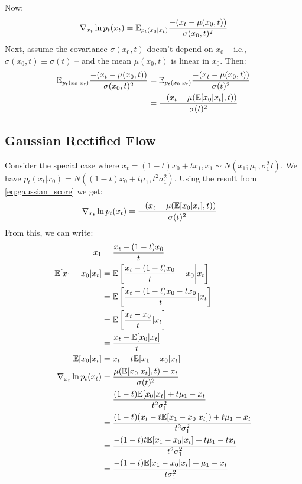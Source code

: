 Now:
\begin{equation}
\nabla_{x_t} \ln p_t(x_t) = \mathbb{E}_{p_t(x_0|x_t)} \frac{-(x_t - \mu(x_0, t))}{\sigma(x_0, t)^2}
\end{equation}
Next, assume the covariance $\sigma(x_0,t)$ doesn't depend on $x_0$ -- i.e., $\sigma(x_0, t) \equiv \sigma(t)$ -- and the mean $\mu(x_0, t)$ is linear in $x_0$.
Then:
\begin{align}
\mathbb{E}_{p_t(x_0|x_t)} \frac{-(x_t - \mu(x_0, t))}{\sigma(x_0, t)^2} &= \mathbb{E}_{p_t(x_0|x_t)} \frac{-(x_t - \mu(x_0, t))}{\sigma(t)^2} \\
\label{eq:gaussian_score}
&= \frac{-(x_t - \mu(\mathbb{E}[x_0|x_t], t))}{\sigma(t)^2}
\end{align}

\subsection{Gaussian Rectified Flow}
Consider the special case where $x_t = (1-t)x_0 + tx_1, x_1 \sim N(x_1; \mu_1, \sigma_1^2I)$.
We have $p_t(x_t|x_0) = N((1-t)x_0 + t\mu_1, t^2\sigma_1^2)$.
Using the result from \cref{eq:gaussian_score} we get:
\begin{align}
\nabla_{x_t} \ln p_t(x_t) &= \frac{-(x_t - \mu(\mathbb{E}[x_0|x_t], t))}{\sigma(t)^2}
\end{align}
From this, we can write:
\begin{align}
x_1 &= \frac{x_t - (1-t)x_0}{t} \\
\mathbb{E} [x_1-x_0 | x_t] &= \mathbb{E} \left[\frac{x_t - (1-t)x_0}{t} - x_0 \bigg\lvert x_t\right] \\
&= \mathbb{E} \left[\frac{x_t - (1-t)x_0 - tx_0}{t} | x_t\right] \\
&= \mathbb{E} \left[\frac{x_t-x_0}{t} | x_t\right] \\
&= \frac{x_t - \mathbb{E}[x_0|x_t]}{t} \\
\mathbb{E}[x_0|x_t] &= x_t - t\mathbb{E} [x_1-x_0 | x_t] \\
\nabla_{x_t} \ln p_t(x_t) &= \frac{\mu(\mathbb{E}[x_0|x_t], t)-x_t}{\sigma(t)^2} \\
&= \frac{(1-t)\mathbb{E}[x_0|x_t]+t\mu_1-x_t}{t^2\sigma_1^2} \\
&= \frac{(1-t)(x_t - t\mathbb{E} [x_1-x_0 | x_t])+t\mu_1-x_t}{t^2\sigma_1^2} \\
&= \frac{-(1-t)t\mathbb{E} [x_1-x_0 | x_t]+t\mu_1-tx_t}{t^2\sigma_1^2} \\
&= \frac{-(1-t)\mathbb{E} [x_1-x_0 | x_t]+\mu_1-x_t}{t\sigma_1^2} \label{eq:gauss_rect_score}
\end{align}

